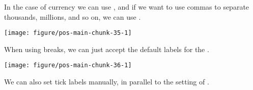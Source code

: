 \documentclass[krantz2]{krantz}\usepackage{knitr}%
\begin{document}
\sloppy
In the case of currency we can use , and if we want to use commas to separate thousands, millions, and so on, we can use .

\begin{knitrout}\footnotesize
{}\color{fgcolor}\begin{kframe}
\begin{alltt}
  \hlopt{+}
  \hlstd{()} \hlopt{+}
  \hlstd{(} \hlopt{::}
\end{alltt}
\end{kframe}

{\centering \texttt{[image: figure/pos-main-chunk-35-1]} 

}



\end{knitrout}

When using breaks, we can just accept the default labels for the .

\begin{knitrout}\footnotesize
{}\color{fgcolor}\begin{kframe}
\begin{alltt}
  \hlopt{+}
  \hlstd{()} \hlopt{+}
  \hlstd{(} \hlstd{=} \hlstd{(}\hlstd{,} \hlstd{,} \hlstd{,} \hlstd{))}
\end{alltt}
\end{kframe}

{\centering \texttt{[image: figure/pos-main-chunk-36-1]} 

}



\end{knitrout}

We can also set tick labels manually, in parallel to the setting of .
\end{document}
